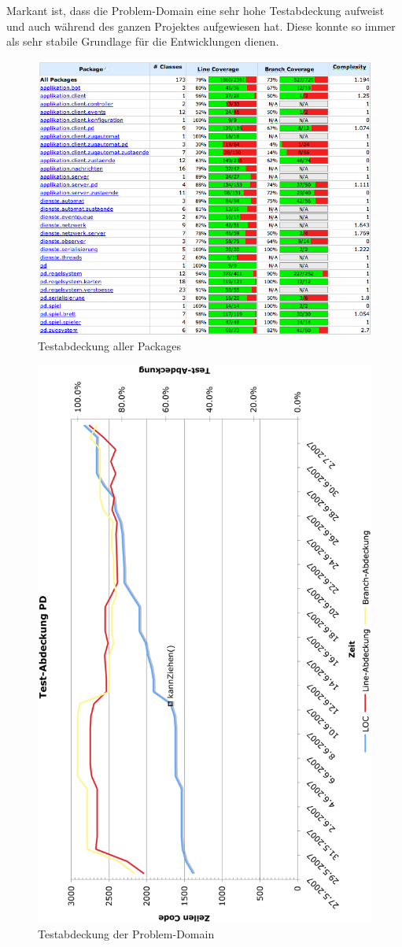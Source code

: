 \documentclass[12pt,halfparskip]{scrartcl}
\begin{document}
Markant ist, dass die Problem-Domain eine sehr hohe Testabdeckung aufweist und auch während des ganzen Projektes aufgewiesen hat. Diese konnte so immer als sehr stabile Grundlage für die Entwicklungen dienen.
\begin{figure}[h]
	\centering
	\includegraphics[width=0.8 \textwidth]{test_abdeckung_gesamt}
	\caption{Testabdeckung aller Packages}
	\label{fig:test_abdeckung_gesamt}
\end{figure}
\begin{figure}[h]
	\centering
	\includegraphics[width=0.8 \textwidth]{test_abdeckung_pd}
	\caption{Testabdeckung der Problem-Domain}
	\label{fig:test_abdeckung_pd}
\end{figure}
\end{document}
